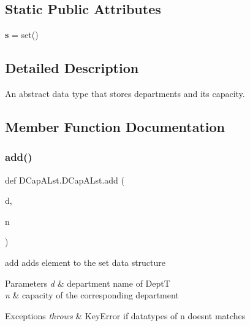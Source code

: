 \subsection*{Static Public Attributes}
\begin{DoxyCompactItemize}
\item 
\mbox{\label{class_d_cap_a_lst_1_1_d_cap_a_lst_a3beaf12440f69c7c35f12c8fde66e139}} 
{\bfseries s} = set()
\end{DoxyCompactItemize}


\subsection{Detailed Description}
An abstract data type that stores departments and it\textquotesingle{}s capacity. 

\subsection{Member Function Documentation}
\mbox{\label{class_d_cap_a_lst_1_1_d_cap_a_lst_ad99d7bc7b919406b4a700f19b8cd7f14}} 
\subsubsection{\texorpdfstring{add()}{add()}}
{\footnotesize\ttfamily def D\+Cap\+A\+Lst.\+D\+Cap\+A\+Lst.\+add (\begin{DoxyParamCaption}\item[{}]{d,  }\item[{}]{n }\end{DoxyParamCaption})\hspace{0.3cm}{\ttfamily [static]}}



add adds element to the set data structure 


\begin{DoxyParams}{Parameters}
{\em d} & department name of DeptT \\
\hline
{\em n} & capacity of the corresponding department \\
\hline
\end{DoxyParams}

\begin{DoxyExceptions}{Exceptions}
{\em throws} & Key\+Error if datatypes of n doesn\textquotesingle{}t matches \\
\hline
\end{DoxyExceptions}
\mbox{\label{class_d_cap_a_lst_1_1_d_cap_a_lst_a4551b60c299ae51b0fd00257a40d61db}} 
